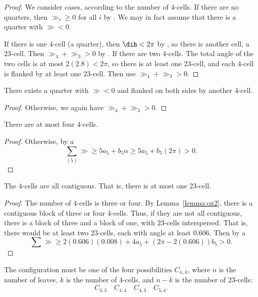 \begin{proof} We consider cases, according to the number of $4$-cells.  If there are no quarters, then
$\gg_i\ge0$ for all $i$ by .
We may in fact assume that there is a quarter with $\gg<0$.

If there is one $4$-cell (a quarter), then $\dih < 2\pi$ by , so there is another cell, a $23$-cell.
Then $\gg_4 + \gg_3 > 0$ by .
If there are two $4$-cells.  The total angle of the two cells is at most $2 (2.8) < 2\pi$, so there is at least one $23$-cell, and each $4$-cell is flanked by at least one $23$-cell.
Then use $\gg_4+\gg_3>0$.
\end{proof}

\begin{lemma}\label{lemma:ox2} 
There exists a quarter with $\gg<0$ and flanked on both sides by another $4$-cell.
\end{lemma}

\begin{proof}
Otherwise, we again have $\gg_4+\gg_3>0$.
\end{proof}

\begin{lemma}\label{lemma:ox44} There are at most four $4$-cells.
\end{lemma}

\begin{proof}
  Otherwise, by a 
\[
\sum_{(5)} \gg \ge 5 a_5 + b_5\alpha \ge 5 a_5 +  b_5 (2\pi) > 0.
\]
\end{proof}

\begin{lemma}\label{lemma:oxC} The $4$-cells are all contiguous.  That is, there is at most one $23$-cell.
\end{lemma}

\begin{proof}
The number of $4$-cells is three or four.
By Lemma~\ref{lemma:ox2}, there is a contiguous block of three or four $4$-cells.  Thus,
if they are not all contiguous, there is a block of three and a block of one,
with $23$-cells interspersed.  That is, there would be at least two $23$-cells,
each with angle at least $0.606$.  Then by a 
\[
\sum \gg \ge 2 (0.606) (0.008) + 4 a_5 + (2\pi-2 (0.606)) b_5 > 0.
\]
\end{proof}

\begin{lemma}\label{lemma:ox-cases} The configuration must be one of the four possibilities $C_{n,k}$, where $n$ is the number of leaves, $k$ is the number of $4$-cells, and $n-k$ is the number of $23$-cells:
\[
C_{3,3}\quad C_{4,4}\quad C_{4,3}\quad C_{5,4}.
\]
\end{lemma}

